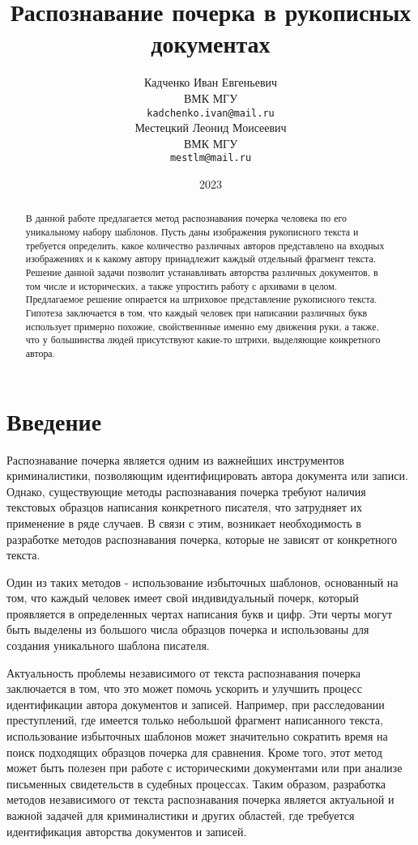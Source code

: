 \documentclass{article}
\title{Распознавание почерка в рукописных документах}
\author{Кадченко Иван Евгеньевич \\
	ВМК МГУ\\
	\texttt{kadchenko.ivan@mail.ru} \\
	\And
	Местецкий Леонид Моисеевич \\
	ВМК МГУ\\
	\texttt{mestlm@mail.ru} \\
}
\date{2023}
\begin{document}
\maketitle

\begin{abstract}
	В данной работе предлагается метод распознавания почерка человека по его уникальному набору шаблонов. Пусть даны изображения рукописного текста и требуется определить, какое количество различных авторов представлено на входных изображениях и к какому автору принадлежит каждый отдельный фрагмент текста. Решение данной задачи позволит устанавливать авторства различных документов, в том числе и исторических, а также упростить работу с архивами в целом. Предлагаемое решение опирается на штриховое представление рукописного текста. Гипотеза заключается в том, что каждый человек при написании различных букв использует примерно похожие, свойственнные именно ему движения руки, а также, что у большинства людей присутствуют какие-то штрихи, выделяющие конкретного автора.
\end{abstract}



\section{Введение}
Распознавание почерка является одним из важнейших инструментов криминалистики, позволяющим идентифицировать автора документа или записи. Однако, существующие методы распознавания почерка требуют наличия текстовых образцов написания конкретного писателя, что затрудняет их применение в ряде случаев. В связи с этим, возникает необходимость в разработке методов распознавания почерка, которые не зависят от конкретного текста.

Один из таких методов - использование избыточных шаблонов, основанный на том, что каждый человек имеет свой индивидуальный почерк, который проявляется в определенных чертах написания букв и цифр. Эти черты могут быть выделены из большого числа образцов почерка и использованы для создания уникального шаблона писателя.

Актуальность проблемы независимого от текста распознавания почерка заключается в том, что это может помочь ускорить и улучшить процесс идентификации автора документов и записей. Например, при расследовании преступлений, где имеется только небольшой фрагмент написанного текста, использование избыточных шаблонов может значительно сократить время на поиск подходящих образцов почерка для сравнения. Кроме того, этот метод может быть полезен при работе с историческими документами или при анализе письменных свидетельств в судебных процессах. Таким образом, разработка методов независимого от текста распознавания почерка является актуальной и важной задачей для криминалистики и других областей, где требуется идентификация авторства документов и записей.
\end{document}
